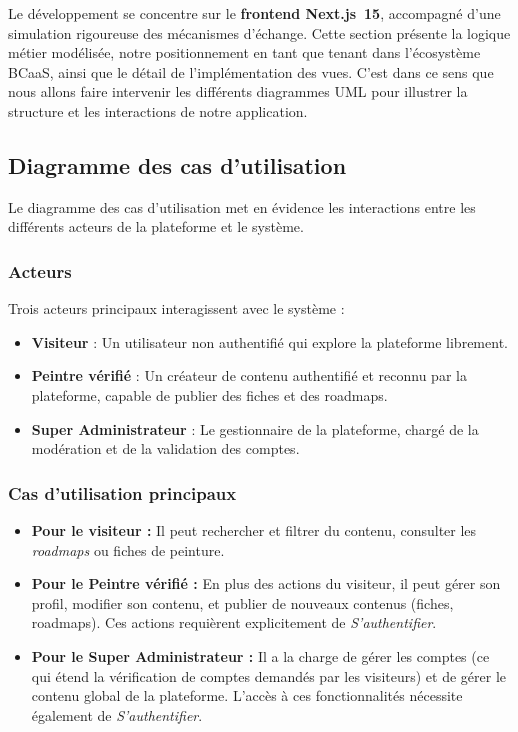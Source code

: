 \documentclass[12pt,a4paper]{report}
\begin{document}
Le développement se concentre sur le \textbf{frontend Next.js~15}, accompagné d'une simulation rigoureuse des mécanismes d'échange. Cette section présente la logique métier modélisée, notre positionnement en tant que tenant dans l'écosystème BCaaS, ainsi que le détail de l'implémentation des vues. C'est dans ce sens que nous allons faire intervenir les différents diagrammes UML pour illustrer la structure et les interactions de notre application.

\subsection{Diagramme des cas d'utilisation}

Le diagramme des cas d'utilisation met en évidence les interactions entre les différents acteurs de la plateforme et le système.

\subsubsection*{Acteurs}

Trois acteurs principaux interagissent avec le système :
\begin{itemize}
    \item \textbf{Visiteur} : Un utilisateur non authentifié qui explore la plateforme librement.
    \item \textbf{Peintre vérifié} : Un créateur de contenu authentifié et reconnu par la plateforme, capable de publier des fiches et des roadmaps.
    \item \textbf{Super Administrateur} : Le gestionnaire de la plateforme, chargé de la modération et de la validation des comptes.
\end{itemize}

\subsubsection*{Cas d'utilisation principaux}

\begin{itemize}
    \item \textbf{Pour le visiteur :} Il peut rechercher et filtrer du contenu, consulter les \textit{roadmaps} ou fiches de peinture.
    \item \textbf{Pour le Peintre vérifié :} En plus des actions du visiteur, il peut gérer son profil, modifier son contenu, et publier de nouveaux contenus (fiches, roadmaps). Ces actions requièrent explicitement de \textit{S'authentifier}.
    \item \textbf{Pour le Super Administrateur :} Il a la charge de gérer les comptes (ce qui étend la vérification de comptes demandés par les visiteurs) et de gérer le contenu global de la plateforme. L'accès à ces fonctionnalités nécessite également de \textit{S'authentifier}.
\end{itemize}
\end{document}
